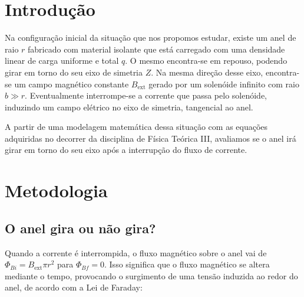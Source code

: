 \documentclass[
	article,
	11pt,
	oneside,
	a4paper,
	english,
	brazil,
	sumario=tradicional
	]{abntex2}
\begin{document}
\frenchspacing


\textual
\section{Introdução}

Na configuração inicial da situação que nos propomos estudar, existe um anel de raio $r$ fabricado com material isolante que está carregado com uma densidade linear de carga uniforme e total $q$. O mesmo encontra-se em repouso, podendo girar em torno do seu eixo de simetria $Z$. Na mesma direção desse eixo, encontra-se um campo magnético constante $B_{\text{ext}}$ gerado por um solenóide infinito com raio $b \gg r$. Eventualmente interrompe-se a corrente que passa pelo solenóide, induzindo um campo elétrico no eixo de simetria, tangencial ao anel.

A partir de uma modelagem matemática dessa situação com as equações adquiridas no decorrer da disciplina de Física Teórica III, avaliamos se o anel irá girar em torno do seu eixo após a interrupção do fluxo de corrente.

\section{Metodologia}

\subsection{O anel gira ou não gira?}
Quando a corrente é interrompida, o fluxo magnético sobre o anel vai de $\Phi_{Bi} = B_{\text{ext}} \pi r^2$ para $\Phi_{Bf} = 0$. Isso significa que o fluxo magnético se altera mediante o tempo, provocando o surgimento de uma tensão induzida ao redor do anel, de acordo com a Lei de Faraday:
\end{document}
